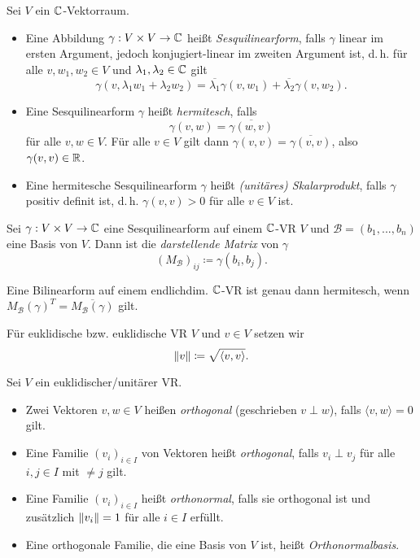 \documentclass{cheat-sheet}
\newcommand{\BB}{\mathcal{B}}
\begin{document}
\begin{defn}
  Sei $V$ ein $\mathbb{C}$-Vektorraum.
  \begin{itemize}
    \item Eine Abbildung $\gamma : V \times V \to \mathbb{C}$ heißt \emph{Sesquilinearform}, falls $\gamma$ linear im ersten Argument, jedoch konjugiert-linear im zweiten Argument ist, d.\,h. für alle $v, w_1, w_2 \in V$ und $\lambda_1, \lambda_2 \in \mathbb{C}$ gilt
    \[ \gamma(v, \lambda_1 w_1 + \lambda_2 w_2) = \overline{\lambda_1} \gamma(v, w_1) + \overline{\lambda_2} \gamma(v, w_2). \]
    \item Eine Sesquilinearform $\gamma$ heißt \emph{hermitesch}, falls
    \[ \gamma(v, w) = \overline{\gamma(w, v)} \]
    für alle $v, w \in V$. Für alle $v \in V$ gilt dann $\gamma(v, v) = \overline{\gamma(v, v)}$, also $\gamma(v, v) \in \mathbb{R}$.
    \item Eine hermitesche Sesquilinearform $\gamma$ heißt \emph{(unitäres) Skalarprodukt}, falls $\gamma$ positiv definit ist, d.\,h. $\gamma(v, v) > 0$ für alle $v \in V$ ist.
  \end{itemize}
\end{defn}

\begin{defn}
  Sei $\gamma : V \times V \to \mathbb{C}$ eine Sesquilinearform auf einem $\mathbb{C}$-VR $V$ und $\BB = (b_1, ..., b_n)$ eine Basis von $V$. Dann ist die \emph{darstellende Matrix} von $\gamma$
  \[ (M_{\BB})_{ij} \coloneqq \gamma(b_i, b_j). \]
\end{defn}

\begin{bem}
  Eine Bilinearform auf einem endlichdim. $\mathbb{C}$-VR ist genau dann hermitesch, wenn $M_{\BB}(\gamma)^{T} = \overline{M_{\BB}(\gamma)}$ gilt. 
\end{bem}

\begin{defn}
  Für euklidische bzw. euklidische VR $V$ und $v \in V$ setzen wir
  \[ \lVert v\rVert \coloneqq \sqrt{ \langle v , v \rangle }. \]
\end{defn}

\begin{defn}
  Sei $V$ ein euklidischer/unitärer VR.
  \begin{itemize}
    \item Zwei Vektoren $v, w \in V$ heißen \emph{orthogonal} (geschrieben $v \perp w$), falls $\langle v , w \rangle = 0$ gilt.
    \item Eine Familie $(v_i)_{i \in I}$ von Vektoren heißt \emph{orthogonal}, falls $v_i \perp v_j$ für alle $i, j \in I$ mit $ \not= j$ gilt.
    \item Eine Familie $(v_i)_{i \in I}$ heißt \emph{orthonormal}, falls sie orthogonal ist und zusätzlich $\lVert v_i\rVert = 1$ für alle $i \in I$ erfüllt.
    \item Eine orthogonale Familie, die eine Basis von $V$ ist, heißt \emph{Orthonormalbasis}.
  \end{itemize}
\end{defn}
\end{document}
